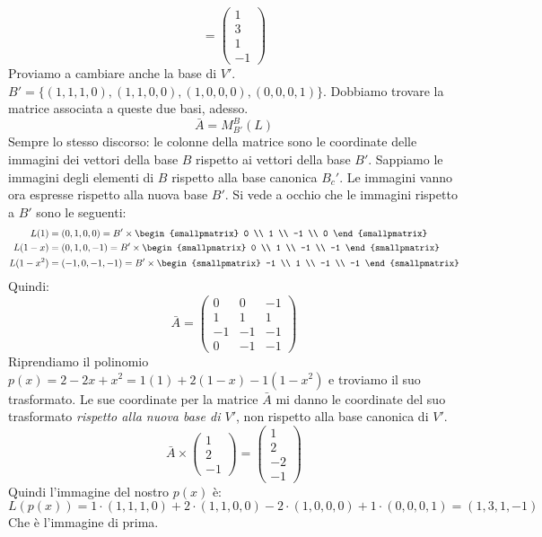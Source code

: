\begin{exmp}
\[=
\begin{pmatrix}
1 \\ 3 \\ 1 \\ -1
\end{pmatrix}
\]
Proviamo a cambiare anche la base di $V'$. $B' = \{ (1,1,1,0), (1,1,0,0), (1,0,0,0), (0,0,0,1)\}$. Dobbiamo trovare la matrice associata a queste due basi, adesso.
\[
\bar A = M_{B'}^{B} (L)
\]
Sempre lo stesso discorso: le colonne della matrice sono le coordinate delle immagini dei vettori della base $B$ rispetto ai vettori della base $B'$. Sappiamo le immagini degli elementi di $B$ rispetto alla base canonica $B_c'$. Le immagini vanno ora espresse rispetto alla nuova base $B'$. Si vede a occhio che le immagini rispetto a $B'$ sono le seguenti:
\begin{align*}
L(1) &= (0,1,0,0) = B' \times 
\begin{smallpmatrix}
0 \\ 1 \\ -1 \\ 0 
\end{smallpmatrix} \\
L(1 - x) &= (0, 1, 0, -1) = B' \times 
\begin{smallpmatrix}
0 \\ 1 \\ -1 \\ -1 
\end{smallpmatrix}\\
L(1 - x^2) &= (-1, 0, -1, -1) = B' \times 
\begin{smallpmatrix}
-1 \\ 1 \\ -1 \\ -1
\end{smallpmatrix}
\end{align*}
Quindi:
\[
\bar A = 
\begin{pmatrix}
0 & 0 & -1 \\
1 & 1 & 1 \\
-1 & -1 & -1 \\
0 & -1 & -1
\end{pmatrix}
\]
Riprendiamo il polinomio $p(x) = 2 - 2x + x^2 = 1(1) + 2(1-x) - 1(1 - x^2)$ e troviamo il suo trasformato. Le sue coordinate per la matrice $\bar A$ mi danno le coordinate del suo trasformato \emph{rispetto alla nuova base di $V'$}, non rispetto alla base canonica di $V'$.
\[
\bar A \times 
\begin{pmatrix}
1 \\ 2 \\ -1 
\end{pmatrix}
= 
\begin{pmatrix}
1 \\ 2 \\ -2 \\ -1
\end{pmatrix}
\]
Quindi l'immagine del nostro $p(x)$ \`e:
\[
L(p(x)) = 1 \cdot (1,1,1,0) + 2 \cdot (1,1,0,0) - 2 \cdot (1,0,0,0) + 1 \cdot (0,0,0,1) =
(1, 3, 1, -1)
\]
Che \`e l'immagine di prima.
\end{exmp}

